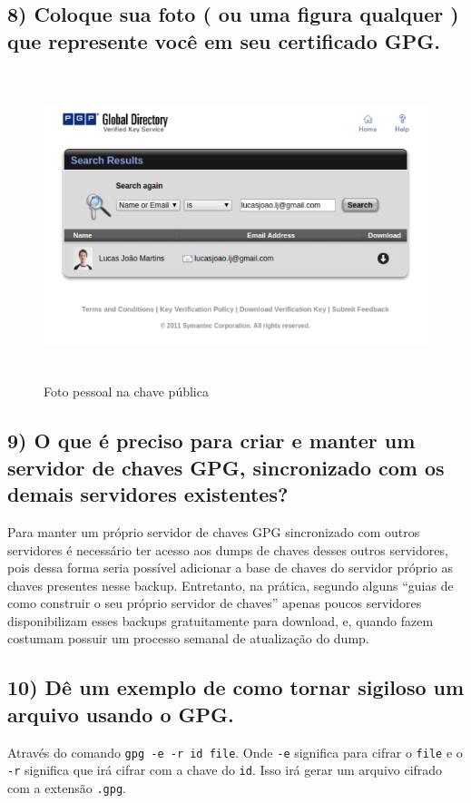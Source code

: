 \documentclass[12pt]{article}
\begin{document}
\subsection*{8) Coloque sua foto ( ou uma figura qualquer ) que represente você em seu certificado GPG.}
\begin{figure}[!h] %
  \includegraphics[width=\linewidth, height=9cm]{status02}
  \caption{Foto pessoal na chave pública}
\end{figure}

\subsection*{9) O que é preciso para criar e manter um servidor de chaves GPG, sincronizado com os demais servidores existentes?}
Para manter um próprio servidor de chaves GPG sincronizado com outros servidores é necessário ter acesso aos dumps de chaves desses outros servidores, pois dessa forma seria possível adicionar a base de chaves do servidor próprio as chaves presentes nesse backup. Entretanto, na prática, segundo alguns ``guias de como construir o seu próprio servidor de chaves'' apenas poucos servidores disponibilizam esses backups gratuitamente para download, e, quando fazem costumam possuir um processo semanal de atualização do dump.

\subsection*{10) Dê um exemplo de como tornar sigiloso um arquivo usando o GPG.}
Através do comando \lstinline{gpg -e -r id file}. Onde \lstinline{-e} significa para cifrar o \lstinline{file} e o \lstinline{-r} significa que irá cifrar com a chave do \lstinline{id}. Isso irá gerar um arquivo cifrado com a extensão \lstinline{.gpg}.
\end{document}
